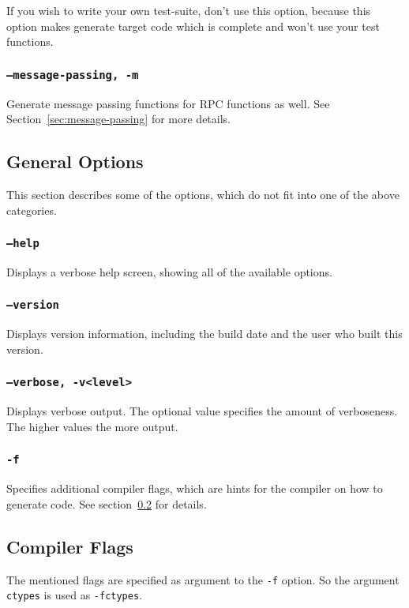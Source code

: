 If you wish to write your own test-suite, don't use this
option, because this option makes \dice{} generate target
code which is complete and won't use your test functions.


\subsubsection{{\tt --message-passing, -m}}
Generate message passing functions for RPC functions as well.
See Section~\ref{sec:message-passing} for more details.

\subsection{General Options}
This section describes some of the options, which do not fit into one 
of the above categories.

\subsubsection{{\tt --help}}
Displays a verbose help screen, showing all of the available
options.

\subsubsection{{\tt --version}}
Displays version information, including the build date and the
user who built this version.

\subsubsection{{\tt --verbose, -v<level>}}
Displays verbose output.  The optional value specifies the amount of
verboseness. The higher values the more output.

\subsubsection{{\tt -f}}
Specifies additional compiler flags, which are hints for the compiler
on how to generate code. See section~\ref{sec:comp-flags} for details.

\subsection{Compiler Flags}
\label{sec:comp-flags}
The mentioned flags are specified as argument to the {\tt -f} option.
So the argument {\tt ctypes} is used as {\tt -fctypes}.

